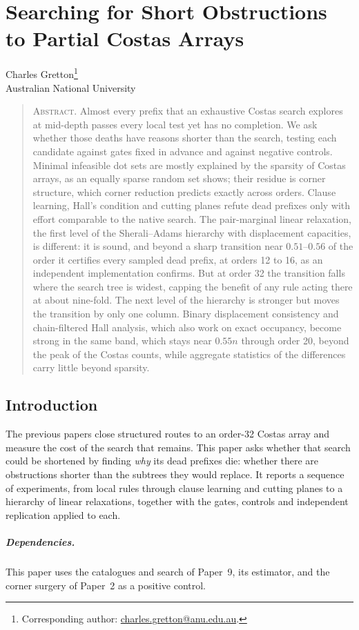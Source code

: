 \documentclass[11pt,a4paper,oneside]{report}
\makeatletter
\theoremstyle{definition}
\newcommand{\paperauthor}{\begin{center}\large Charles Gretton\footnote{Corresponding author: \href{mailto:charles.gretton@anu.edu.au}{charles.gretton@anu.edu.au}.}\\[2pt]\normalsize Australian National University\end{center}\vspace{0.5em}}
\newcommand{\paperabstract}[1]{\begin{quote}\small\noindent\textsc{Abstract.} #1\end{quote}\vspace{0.5em}}
\makeatother
\begin{document}
\chapter{Searching for Short Obstructions to Partial Costas Arrays}\label{p10-paper}
\paperauthor
\paperabstract{Almost every prefix that an exhaustive Costas search explores at mid-depth passes every local
test yet has no completion. We ask whether those deaths have reasons shorter than the search, testing each
candidate against gates fixed in advance and against negative controls. Minimal infeasible dot sets are
mostly explained by the sparsity of Costas arrays, as an equally sparse random set shows; their residue is
corner structure, which corner reduction predicts exactly across orders. Clause learning, Hall's condition
and cutting planes refute dead prefixes only with effort comparable to the native search. The
pair-marginal linear relaxation, the first level of the Sherali--Adams hierarchy with displacement
capacities, is different: it is sound, and beyond a sharp transition near $0.51$--$0.56$ of the order it
certifies every sampled dead prefix, at orders 12 to 16, as an independent implementation confirms. But at
order 32 the transition falls where the search tree is widest, capping the benefit of any rule acting there
at about nine-fold. The next level of the hierarchy is stronger but moves the transition by only one column. Binary displacement consistency and chain-filtered Hall analysis, which also work on exact occupancy, become strong in the same band, which stays near $0.55n$ through order 20, beyond the peak of the Costas counts, while aggregate statistics of the differences carry little beyond sparsity.}

\section{Introduction}\label{p10-sec:paperintro}
The previous papers close structured routes to an order-32 Costas array and measure the cost of
the search that remains. This paper asks whether that search could be shortened by finding \emph{why} its
dead prefixes die: whether there are obstructions shorter than the subtrees they would replace. It reports
a sequence of experiments, from local rules through clause learning and cutting planes to a hierarchy of
linear relaxations, together with the gates, controls and independent replication applied to each.

\paragraph{Dependencies.} This paper uses the catalogues and search of Paper~9, its estimator, and the corner
surgery of Paper~2 as a positive control.
\end{document}
